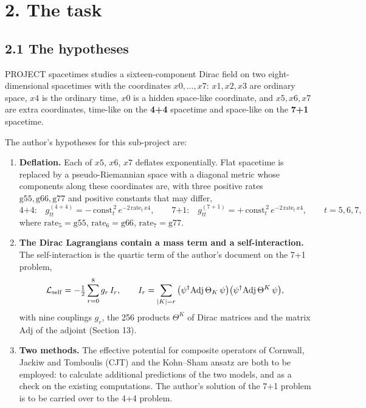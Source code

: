 \documentclass[
  10pt,
]{article}
\providecommand{\tightlist}{%
  \setlength{\itemsep}{0pt}\setlength{\parskip}{0pt}}
\begin{document}
\hypertarget{the-task}{%
\section{2. The task}\label{the-task}}

\hypertarget{the-hypotheses}{%
\subsection{2.1 The hypotheses}\label{the-hypotheses}}

PROJECT spacetimes studies a sixteen-component Dirac field on two
eight-dimensional spacetimes with the coordinates \(x0,\dots,x7\):
\(x1,x2,x3\) are ordinary space, \(x4\) is the ordinary time, \(x0\) is
a hidden space-like coordinate, and \(x5,x6,x7\) are extra coordinates,
time-like on the \textbf{4+4} spacetime and space-like on the
\textbf{7+1} spacetime.

The author's hypotheses for this sub-project are:

\begin{enumerate}
\def\labelenumi{\arabic{enumi}.}
\tightlist
\item
  \textbf{Deflation.} Each of \(x5\), \(x6\), \(x7\) deflates
  exponentially. Flat spacetime is replaced by a pseudo-Riemannian space
  with a diagonal metric whose components along these coordinates are,
  with three positive rates \(\mathrm{g55},\mathrm{g66},\mathrm{g77}\)
  and positive constants that may differ,
  \[\text{4+4:}\quad g^{(4+4)}_{tt}=-\,\mathrm{const}_t^{\,2}\,e^{-2\,\mathrm{rate}_t\,x4},\qquad
  \text{7+1:}\quad g^{(7+1)}_{tt}=+\,\mathrm{const}_t^{\,2}\,e^{-2\,\mathrm{rate}_t\,x4},\qquad t=5,6,7,\]
  where \(\mathrm{rate}_5=\mathrm{g55}\),
  \(\mathrm{rate}_6=\mathrm{g66}\), \(\mathrm{rate}_7=\mathrm{g77}\).
\item
  \textbf{The Dirac Lagrangians contain a mass term and a
  self-interaction.} The self-interaction is the quartic term of the
  author's document on the 7+1 problem,
  \[\mathcal L_{\rm self}=-\tfrac12\sum_{r=0}^{8}g_r\,I_r,\qquad
  I_r=\sum_{|K|=r}\big(\psi^\dagger\mathrm{Adj}\,\Theta_K\,\psi\big)\big(\psi^\dagger\mathrm{Adj}\,\Theta^K\,\psi\big),\]
  with nine couplings \(g_r\), the 256 products \(\Theta^K\) of Dirac
  matrices and the matrix \(\mathrm{Adj}\) of the adjoint (Section 13).
\item
  \textbf{Two methods.} The effective potential for composite operators
  of Cornwall, Jackiw and Tomboulis (CJT) and the Kohn--Sham ansatz are
  both to be employed: to calculate additional predictions of the two
  models, and as a check on the existing computations. The author's
  solution of the 7+1 problem is to be carried over to the 4+4 problem.
\end{enumerate}
\end{document}
